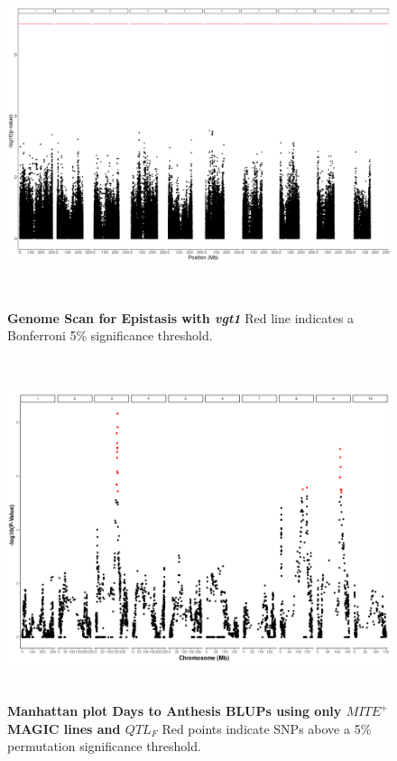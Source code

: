 \documentclass[article,9pt,twocolumn,twoside]{rilabRxiv}
\begin{document}
\begin{figure}[ht]
\centering
\includegraphics[width=16cm,height=10cm]{figures/vgt1_epistasis_scan.png}
\caption{\textbf{Genome Scan for Epistasis with \emph{vgt1}} Red line indicates a Bonferroni 5\% significance threshold.}
\label{fig:supfigure12}
\end{figure}

\begin{figure}[ht]
\centering
\includegraphics[width=16cm,height=10cm]{figures/MITE_only_DTA_manhattan.png}
\caption{\textbf{Manhattan plot Days to Anthesis BLUPs using only $MITE^+$ MAGIC lines and $QTL_F$} Red points indicate SNPs above a  5\% permutation significance threshold.}
\label{fig:supfigure13}
\end{figure}
\end{document}
